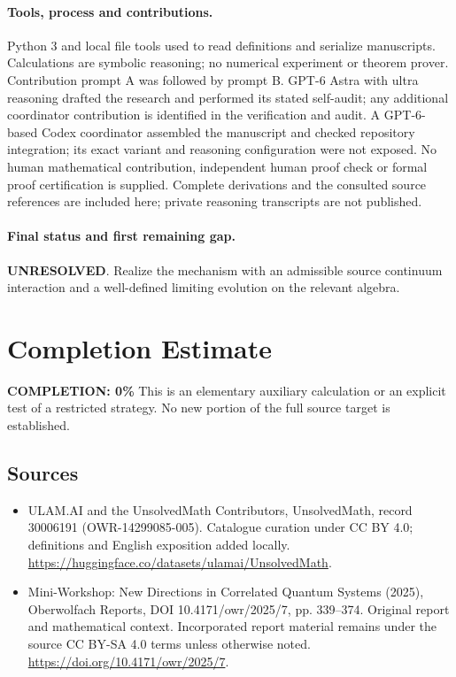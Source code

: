 \documentclass[11pt]{article}
\begin{document}
\paragraph{Tools, process and contributions.}
Python 3 and local file tools used to read definitions and serialize manuscripts. Calculations are symbolic reasoning; no numerical experiment or theorem prover. Contribution prompt A was followed by prompt B. GPT-6 Astra with ultra reasoning drafted the research and performed its stated self-audit; any additional coordinator contribution is identified in the verification and audit. A GPT-6-based Codex coordinator assembled the manuscript and checked repository integration; its exact variant and reasoning configuration were not exposed. No human mathematical contribution, independent human proof check or formal proof certification is supplied. Complete derivations and the consulted source references are included here; private reasoning transcripts are not published.

\paragraph{Final status and first remaining gap.}
\textbf{UNRESOLVED}. Realize the mechanism with an admissible source continuum interaction and a well-defined limiting evolution on the relevant algebra.

\section{Completion Estimate}
\noindent\textbf{COMPLETION: 0\%}
This is an elementary auxiliary calculation or an explicit test of a restricted strategy. No new portion of the full source target is established.

\subsection{Sources}
\begin{itemize}
\item[\hypertarget{source:30006191:1}{S1}] ULAM.AI and the UnsolvedMath Contributors, UnsolvedMath, record 30006191 (OWR-14299085-005). Catalogue curation under CC BY 4.0; definitions and English exposition added locally.
\url{https://huggingface.co/datasets/ulamai/UnsolvedMath}.
\item[\hypertarget{source:30006191:2}{S2}] Mini-Workshop: New Directions in Correlated Quantum Systems (2025), Oberwolfach Reports, DOI 10.4171/owr/2025/7, pp. 339--374. Original report and mathematical context. Incorporated report material remains under the source CC BY-SA 4.0 terms unless otherwise noted.
\url{https://doi.org/10.4171/owr/2025/7}.
\end{itemize}
\label{end:30006191}
\end{document}

